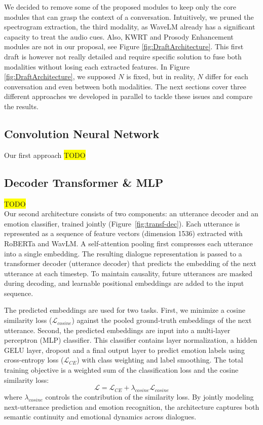 \documentclass{article}
\begin{document}
We decided to remove some of the proposed modules to keep only the core modules that can grasp the context of a conversation. Intuitively, we pruned the spectrogram extraction, the third modality, as WaveLM already has a significant capacity to treat the audio cues.
Also, KWRT and Prosody Enhancement modules are not in our proposal, see Figure \ref{fig:DraftArchitecture}. This first draft is however not really detailed and require specific solution to fuse both modalities without losing each extracted features. In Figure \ref{fig:DraftArchitecture}, we supposed $N$ is fixed, but in reality, $N$ differ for each conversation and even between both modalities. The next sections cover three different approaches we developed in parallel to tackle these issues and compare the results.


\subsection{Convolution Neural Network}
Our first approach
\colorbox{yellow}{TODO}\\

\subsection{Decoder Transformer \& MLP}
\colorbox{yellow}{TODO}\\
Our second architecture consists of two components: an utterance decoder and an emotion classifier, trained jointly (Figure~\ref{fig:transf-dec}). Each utterance is represented as a sequence of feature vectors (dimension 1536) extracted with RoBERTa and WavLM. A self-attention pooling first compresses each utterance into a single embedding. The resulting dialogue representation is passed to a transformer decoder (utterance decoder) that predicts the embedding of the next utterance at each timestep. To maintain causality, future utterances are masked during decoding, and learnable positional embeddings are added to the input sequence.

The predicted embeddings are used for two tasks. First, we minimize a cosine similarity loss ($\mathcal{L}_{cosine}$) against the pooled ground-truth embeddings of the next utterance. Second, the predicted embeddings are input into a multi-layer perceptron (MLP) classifier. This classifier contains layer normalization, a hidden GELU layer, dropout and a final output layer to predict emotion labels using cross-entropy loss ($\mathcal{L}_{CE}$) with class weighting and label smoothing. The total training objective is a weighted sum of the classification loss and the cosine similarity loss:
\[
\mathcal{L}=\mathcal{L}_{CE}+ \lambda_{cosine} \mathcal{L}_{cosine}
\]
where $\lambda_{cosine}$ controls the contribution of the similarity loss. By jointly modeling next-utterance prediction and emotion recognition, the architecture captures both semantic continuity and emotional dynamics across dialogues. 
\end{document}
